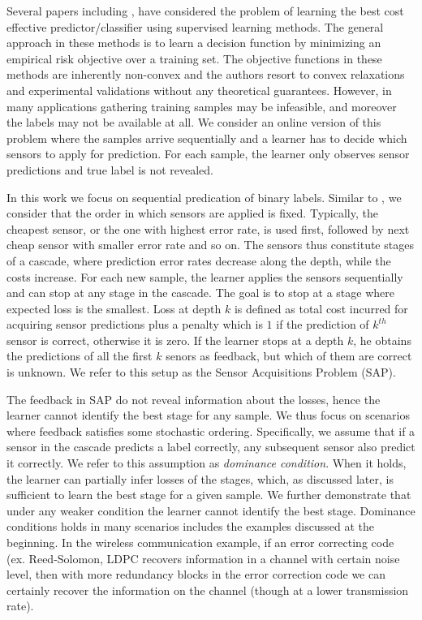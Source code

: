 \documentclass{article}
\begin{document}
Several papers including \cite{AISTATS13_SupervisedSequentialLearning_TrapezSaligram},\cite{ML13_MultistageClassifier_TrapezSaligramaCastanon}\cite{ICML13_CostSensitiveTreeClassification_XuKusnerChenWeinberger} have considered the problem of learning the best cost effective predictor/classifier using supervised learning methods. The general approach in these methods is to learn a decision function by minimizing an empirical risk objective over a training set. The objective functions in these methods are inherently non-convex and the authors resort to convex relaxations and experimental validations without any theoretical guarantees. However, in many applications gathering training samples may be infeasible, and moreover the labels may not be available at all. We consider an online version of this problem where the samples arrive sequentially and a learner has to decide which sensors to apply for prediction. For each sample, the learner only observes sensor predictions and true label is not revealed. 

In this work we focus on sequential predication of binary labels.  Similar to \cite{ML13_MultistageClassifier_TrapezSaligramaCastanon}, we consider that the order in which sensors are applied is fixed. Typically, the cheapest sensor, or the one with highest error rate, is used first, followed by next cheap sensor with smaller error rate and so on. The sensors thus constitute stages of a cascade, where prediction error rates decrease along the depth, while the costs increase. For each new sample, the learner applies the sensors sequentially and can stop at any stage in the cascade. The goal is to stop at a stage where expected loss is the smallest. Loss at depth $k$ is defined as total cost incurred for acquiring sensor predictions plus a penalty which is $1$ if the prediction of $k^{th}$ sensor is correct, otherwise it is zero. If the learner stops at a depth $k$, he obtains the predictions of all the first $k$ senors as feedback, but which of them are correct is unknown. We refer to this setup as the Sensor Acquisitions Problem (SAP). 

The feedback in SAP do not reveal information about the losses, hence the learner cannot identify the best stage for any sample. 
We thus focus on scenarios where feedback satisfies some stochastic ordering. Specifically, we assume that if a sensor in the cascade predicts a label correctly, any subsequent sensor also predict it correctly. We refer to this assumption as {\em dominance condition}. When it holds, the learner can partially infer losses of the stages, which, as discussed later, is sufficient to learn the best stage for a given sample. We further demonstrate that under any weaker condition the learner cannot identify the best stage. Dominance conditions holds in many scenarios includes the examples discussed at the beginning. In the wireless communication example, if an error correcting code (ex. Reed-Solomon, LDPC \cite{Book_InferenceLearning_MacKay} recovers information in a channel with certain noise level, then with more redundancy blocks in the error correction code we can certainly recover the information on the channel (though at a lower transmission rate).     
\end{document}

